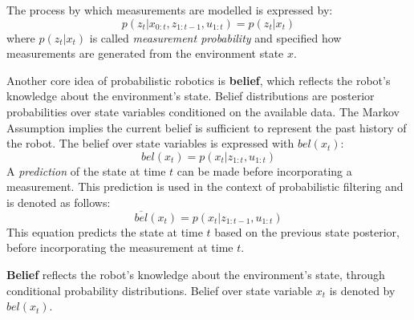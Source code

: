 The process by which measurements are modelled is expressed by:
\begin{equation}
\label{eq:background_measurement_prob}
p(z_t | x_{0:t}, z_{1:t-1}, u_{1:t}) = p(z_t | x_t)
\end{equation}
where $p(z_t | x_t)$ is called \textit{measurement probability} and specified how measurements are generated from the environment state $x$.

Another core idea of probabilistic robotics is \textbf{belief}, which reflects the robot's knowledge about the environment's state.
Belief distributions are posterior probabilities over state variables conditioned on the available data.
The Markov Assumption implies the current belief is sufficient to represent the past history of the robot.
The belief over state variables is expressed with $bel(x_t)$:
\begin{equation}
bel(x_t) = p(x_t | z_{1:t}, u_{1:t})
\end{equation}
A \textit{prediction} of the state at time $t$ can be made before incorporating a measurement.
This prediction is used in the context of probabilistic filtering and is denoted as follows:
\begin{equation}
\overline{bel}(x_t) = p(x_t | z_{1:t-1}, u_{1:t})
\end{equation}
This equation predicts the state at time $t$ based on the previous state posterior, before incorporating the measurement at time $t$.

\begin{mydef}
\textbf{Belief} reflects the robot's knowledge about the environment's state, through conditional probability distributions.
Belief over state variable $x_t$ is denoted by $bel(x_t)$.
\end{mydef}

